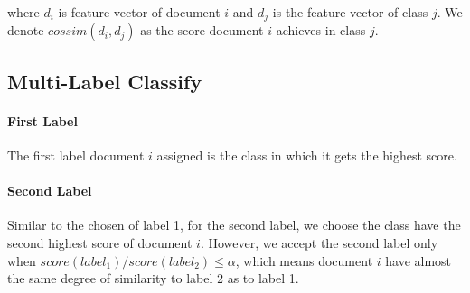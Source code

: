 \documentclass{article}%
\begin{document}
where $d_i$ is feature vector of document $i$ and $d_j$ is the feature vector of class $j$. We denote $cossim(d_i,d_j)$ as the score document $i$ achieves in class $j$.

\subsection{Multi-Label Classify}
\paragraph{First Label} The first label document $i$ assigned is the class in which it gets the highest score.

\paragraph{Second Label} Similar to the chosen of label 1, for the second label, we choose the class have the second highest score of document $i$. However, we accept the second label only when $score(label_1)/score(label_2) \leq \alpha$, which means document $i$ have almost the same degree of similarity to label 2 as to label 1.



\end{document}
